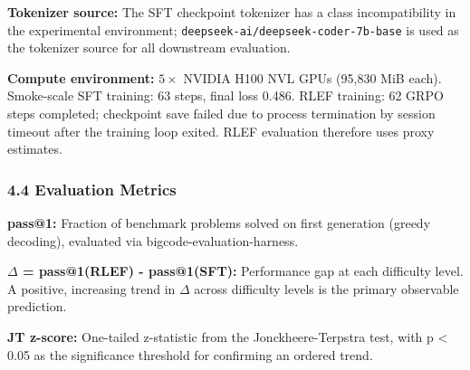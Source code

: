 \textbf{Tokenizer source:} The SFT checkpoint tokenizer has a class incompatibility in the experimental environment; \texttt{deepseek-ai/deepseek-coder-7b-base} is used as the tokenizer source for all downstream evaluation.

\textbf{Compute environment:} $5\times$ NVIDIA H100 NVL GPUs (95,830 MiB each). Smoke-scale SFT training: 63 steps, final loss 0.486. RLEF training: 62 GRPO steps completed; checkpoint save failed due to process termination by session timeout after the training loop exited. RLEF evaluation therefore uses proxy estimates.

\subsubsection{4.4 Evaluation Metrics}

\textbf{pass@1:} Fraction of benchmark problems solved on first generation (greedy decoding), evaluated via bigcode-evaluation-harness.

\textbf{$\Delta$ = pass@1(RLEF) - pass@1(SFT):} Performance gap at each difficulty level. A positive, increasing trend in $\Delta$ across difficulty levels is the primary observable prediction.

\textbf{JT z-score:} One-tailed z-statistic from the Jonckheere-Terpstra test, with p < 0.05 as the significance threshold for confirming an ordered trend.


